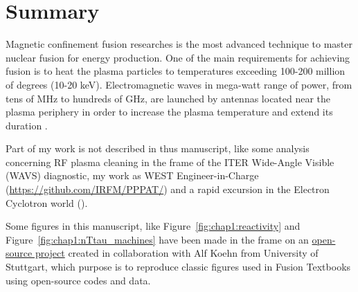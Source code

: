 \chapter{Summary}

Magnetic confinement fusion researches is the most advanced technique to master nuclear fusion for energy production. One of the main requirements for achieving fusion is to heat the plasma particles to temperatures exceeding 100-200 million of degrees (10-20 keV). Electromagnetic waves in mega-watt range of power, from tens of MHz to hundreds of GHz, are launched by antennas located near the plasma periphery in order to increase the plasma temperature and extend its duration . 




Part of my work is not described in thus manuscript, like some analysis concerning RF plasma cleaning in the frame of the ITER Wide-Angle Visible (WAVS) diagnostic, my work as WEST Engineer-in-Charge (\href{https://github.com/IRFM/PPPAT/}{https://github.com/IRFM/PPPAT/}) and a rapid excursion in the Electron Cyclotron world (\cite{farthouat2010}). 


Some figures in this manuscript, like Figure~\ref{fig:chap1:reactivity} and Figure~\ref{fig:chap1:nTtau_machines} have been made in the frame on an \href{https://github.com/alfkoehn/fusion_plots/}{open-source project} created in collaboration with Alf Koehn from University of Stuttgart, which purpose is to reproduce classic figures used in Fusion Textbooks using open-source codes and data.